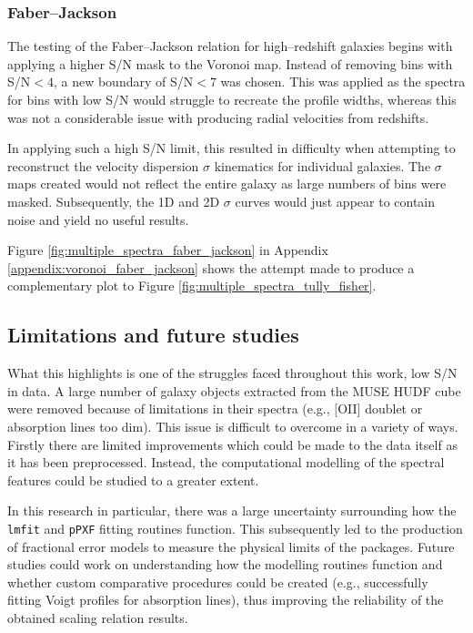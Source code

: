 \documentclass[12pt, twocolumn, nofootinbib]{revtex4-1}    %
\begin{document}
\subsubsection{Faber--Jackson} \label{sec:voronoi_faber_jackson}
\noindent
The testing of the Faber--Jackson relation for high--redshift galaxies begins with applying a higher S/N mask to the Voronoi map. Instead of removing bins with S/N$<4$, a new boundary of S/N$<7$ was chosen. This was applied as the spectra for bins with low S/N would struggle to recreate the profile widths, whereas this was not a considerable issue with producing radial velocities from redshifts. 

In applying such a high S/N limit, this resulted in difficulty when attempting to reconstruct the velocity dispersion $\sigma$ kinematics for individual galaxies. The $\sigma$ maps created would not reflect the entire galaxy as large numbers of bins were masked. Subsequently, the 1D and 2D $\sigma$ curves would just appear to contain noise and yield no useful results.

Figure \ref{fig:multiple_spectra_faber_jackson} in Appendix \ref{appendix:voronoi_faber_jackson} shows the attempt made to produce a complementary plot to Figure \ref{fig:multiple_spectra_tully_fisher}. 

\vspace{2ex} %
\subsection{Limitations and future studies}
\noindent
What this highlights is one of the struggles faced throughout this work, low S/N in data. A large number of galaxy objects extracted from the MUSE HUDF cube were removed because of limitations in their spectra (e.g., [OII] doublet or absorption lines too dim). This issue is difficult to overcome in a variety of ways. Firstly there are limited improvements which could be made to the data itself as it has been preprocessed. Instead, the computational modelling of the spectral features could be studied to a greater extent. 

In this research in particular, there was a large uncertainty surrounding how the \texttt{lmfit} and \texttt{pPXF} fitting routines function. This subsequently led to the production of fractional error models to measure the physical limits of the packages. Future studies could work on understanding how the modelling routines function and whether custom comparative procedures could be created (e.g., successfully fitting Voigt profiles for absorption lines), thus improving the reliability of the obtained scaling relation results.
\end{document}
